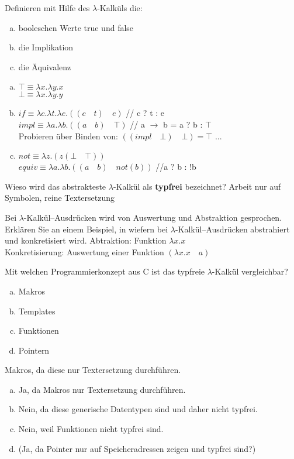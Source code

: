 \begin{card}
	Definieren mit Hilfe des $\lambda$-Kalküls die:
	\begin{enumerate}[a)]
	\item booleschen Werte true und false
	\item die Implikation
	\item die Äquivalenz 
	\end{enumerate}
	\hr
	\begin{enumerate}[a)]
	\item 	$\top \equiv \lambda x.\lambda y . x$\\
			$\bot \equiv \lambda x.\lambda y . y$
	\item 	$if \equiv \lambda c.\lambda t.\lambda e.((c \quad t) \quad e)$ // c ? t : e\\
			$impl \equiv \lambda a.\lambda b.((a \quad b) \quad \top)$ // a $\rightarrow$ b = a ? b : $\top$\\
			Probieren über Binden von: $((impl \quad \bot) \quad \bot) = \top$ ...
	\item	$not \equiv \lambda z.(z (\bot \quad \top))$\\
			$equiv \equiv  \lambda a.\lambda b.((a \quad b) \quad not(b))$ //a ? b : !b
	\end{enumerate}
\end{card}

\begin{card}
	Wieso wird das abstrakteste $\lambda$-Kalkül als \textbf{typfrei} bezeichnet?
	\hr
	Arbeit nur auf Symbolen, reine Textersetzung
\end{card}

\begin{card}
  Bei $\lambda$-Kalkül--Ausdrücken wird von Auswertung und Abstraktion gesprochen. Erklären Sie an einem Beispiel, in wiefern bei $\lambda$-Kalkül--Ausdrücken abstrahiert und konkretisiert wird.
  \hr
  Abtraktion: Funktion $\lambda x.x$\\
  Konkretisierung: Auswertung einer Funktion $(\lambda x.x \quad a)$
\end{card}

\begin{card}
  Mit welchen Programmierkonzept aus C ist das typfreie $\lambda$-Kalkül vergleichbar?
  \begin{enumerate}[a)]
    \item Makros
    \item Templates
    \item Funktionen
    \item Pointern
  \end{enumerate}
  \hr
  Makros, da diese nur Textersetzung durchführen.
  \begin{enumerate}[a)]
    \item Ja, da Makros nur Textersetzung durchführen.
    \item Nein, da diese generische Datentypen sind und daher nicht typfrei.
    \item Nein, weil Funktionen nicht typfrei sind.
    \item (Ja, da Pointer nur auf Speicheradressen zeigen und typfrei sind?)
  \end{enumerate}
\end{card}

